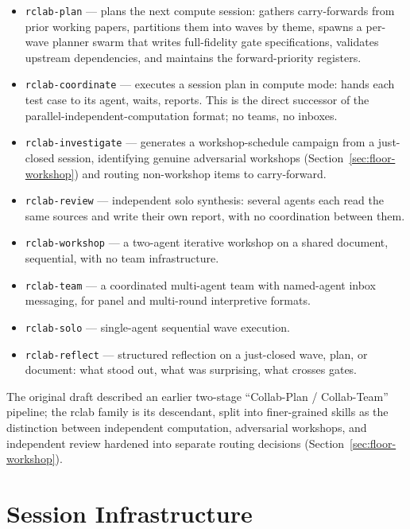 \documentclass[12pt,a4paper]{article}
\begin{document}
\begin{itemize}
    \item \texttt{rclab-plan} --- plans the next compute session: gathers carry-forwards from prior working papers, partitions them into waves by theme, spawns a per-wave planner swarm that writes full-fidelity gate specifications, validates upstream dependencies, and maintains the forward-priority registers.
    \item \texttt{rclab-coordinate} --- executes a session plan in compute mode: hands each test case to its agent, waits, reports. This is the direct successor of the parallel-independent-computation format; no teams, no inboxes.
    \item \texttt{rclab-investigate} --- generates a workshop-schedule campaign from a just-closed session, identifying genuine adversarial workshops (Section~\ref{sec:floor-workshop}) and routing non-workshop items to carry-forward.
    \item \texttt{rclab-review} --- independent solo synthesis: several agents each read the same sources and write their own report, with no coordination between them.
    \item \texttt{rclab-workshop} --- a two-agent iterative workshop on a shared document, sequential, with no team infrastructure.
    \item \texttt{rclab-team} --- a coordinated multi-agent team with named-agent inbox messaging, for panel and multi-round interpretive formats.
    \item \texttt{rclab-solo} --- single-agent sequential wave execution.
    \item \texttt{rclab-reflect} --- structured reflection on a just-closed wave, plan, or document: what stood out, what was surprising, what crosses gates.
\end{itemize}

The original draft described an earlier two-stage ``Collab-Plan / Collab-Team'' pipeline; the rclab family is its descendant, split into finer-grained skills as the distinction between independent computation, adversarial workshops, and independent review hardened into separate routing decisions (Section~\ref{sec:floor-workshop}).

\section{Session Infrastructure}
\label{sec:infrastructure}
\end{document}
